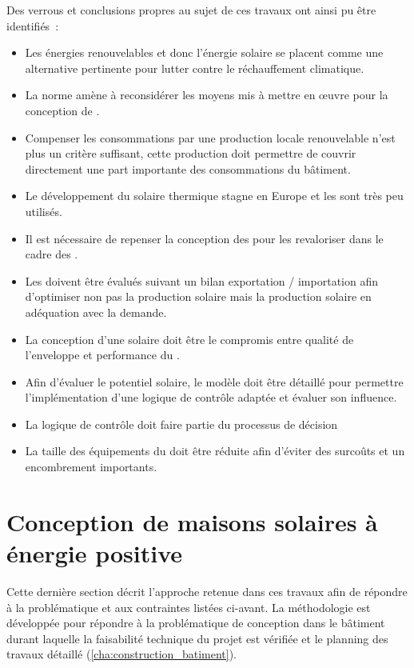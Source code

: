 Des verrous et conclusions propres au sujet de ces travaux ont ainsi pu être identifiés~:
\begin{itemize}
  \item Les énergies renouvelables et donc l’énergie solaire se placent comme une
        alternative pertinente pour lutter contre le réchauffement climatique.
  \item La norme  amène à reconsidérer les moyens mis à mettre
        en œuvre pour la conception de .
  \item Compenser les consommations par une production locale renouvelable n’est plus un critère
        suffisant, cette production doit permettre de couvrir directement une part
        importante des consommations du bâtiment.
  \item Le développement du solaire thermique stagne en Europe et les 
        sont très peu utilisés.
  \item Il est nécessaire de repenser la conception des  pour les revaloriser
        dans le cadre des .
  \item Les  doivent être évalués suivant un bilan exportation / importation
        afin d’optimiser non pas la production solaire mais la production solaire
        en adéquation avec la demande.
  \item La conception d’une  solaire doit être le compromis entre qualité
        de l’enveloppe et performance du .
  \item Afin d’évaluer le potentiel solaire, le modèle doit être détaillé pour
        permettre l’implémentation d’une logique de contrôle adaptée et évaluer
        son influence.
  \item La logique de contrôle doit faire partie du processus de décision
  \item La taille des équipements du  doit être réduite afin d’éviter des
        surcoûts et un encombrement importants.
\end{itemize}




\section{Conception de maisons solaires à énergie positive} %
\label{sec:conception_de_maisons_solaires_a_energie_positive}
Cette dernière section décrit l’approche retenue dans ces travaux afin de répondre à la
problématique et aux contraintes listées ci-avant. La méthodologie est développée pour
répondre à la problématique de conception dans le bâtiment durant
laquelle la faisabilité technique du projet est vérifiée et le planning des travaux
détaillé (\ref{cha:construction_batiment}).

